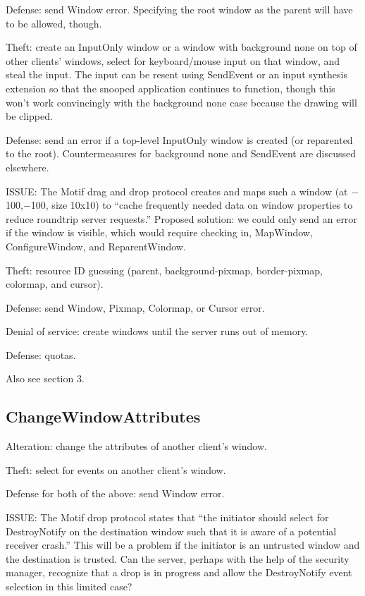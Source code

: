 \documentclass{article}
\begin{document}
Defense: send Window error.  Specifying the root window as the parent will
have to be allowed, though.

Theft: create an InputOnly window or a window with background none on
top of other clients' windows, select for keyboard/mouse input on that
window, and steal the input.  The input can be resent using SendEvent
or an input synthesis extension so that the snooped application
continues to function, though this won't work convincingly with the
background none case because the drawing will be clipped.

Defense: send an error if a top-level InputOnly window is created (or
reparented to the root).  Countermeasures for background none and
SendEvent are discussed elsewhere.

ISSUE: The Motif drag and drop protocol creates and maps such a window
(at $-$100,$-$100, size 10x10) to ``cache frequently needed data on
window properties to reduce roundtrip server requests.''  Proposed
solution: we could only send an error if the window is visible, which
would require checking in, MapWindow, ConfigureWindow, and
ReparentWindow.

Theft: resource ID guessing (parent, background-pixmap, border-pixmap,
colormap, and cursor).

Defense: send Window, Pixmap, Colormap, or Cursor error.

Denial of service: create windows until the server runs out of memory.

Defense: quotas.

Also see section 3.


\subsection{ChangeWindowAttributes}

Alteration: change the attributes of another client's window.

Theft: select for events on another client's window.

Defense for both of the above: send Window error.

ISSUE: The Motif drop protocol states that ``the initiator should
select for DestroyNotify on the destination window such that it is
aware of a potential receiver crash.''  This will be a problem if the
initiator is an untrusted window and the destination is trusted.  Can
the server, perhaps with the help of the security manager, recognize
that a drop is in progress and allow the DestroyNotify event selection
in this limited case?
\end{document}
